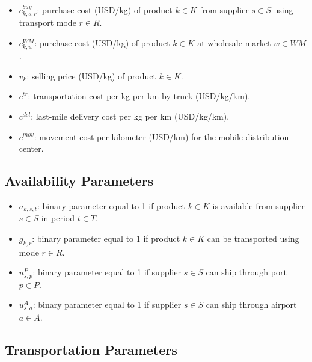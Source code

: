 \documentclass[12pt]{article}
\begin{document}
\begin{itemize}
    \item $c^{buy}_{k,s,r}$: purchase cost (USD/kg) of product $k \in K$ from supplier $s \in S$ using transport mode $r \in R$.

    \item $c^{WM}_{k,w}$: purchase cost (USD/kg) of product $k \in K$ at wholesale market $w \in WM$.

    \item $v_k$: selling price (USD/kg) of product $k \in K$.
    
    \item $c^{tr}$: transportation cost per kg per km by truck (USD/kg/km).
    
    \item $c^{del}$: last-mile delivery cost per kg per km (USD/kg/km).
    
    \item $c^{mov}$: movement cost per kilometer (USD/km) for the mobile distribution center.

\end{itemize}

\subsection{Availability Parameters}

\begin{itemize}
    \item $a_{k,s,t}$: binary parameter equal to 1 if product $k \in K$ is available from supplier $s \in S$ in period $t \in T$.

    \item $g_{k,r}$: binary parameter equal to 1 if product $k \in K$ can be transported using mode $r \in R$.

    \item $u^{P}_{s,p}$: binary parameter equal to 1 if supplier $s \in S$ can ship through port $p \in P$.

    \item $u^{A}_{s,a}$: binary parameter equal to 1 if supplier $s \in S$ can ship through airport $a \in A$.
\end{itemize}

\subsection{Transportation Parameters}
\end{document}
